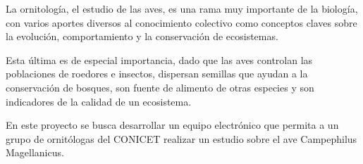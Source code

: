 
La ornitología, el estudio de las aves, es una rama muy importante de la biología, con varios aportes diversos al conocimiento colectivo como conceptos claves sobre la evolución, comportamiento y la conservación de ecosistemas.

Esta última es de especial importancia, dado que las aves controlan las poblaciones de roedores e insectos, dispersan semillas que ayudan a la conservación de bosques, son fuente de alimento de otras especies y son indicadores de la calidad de un ecosistema.


En este proyecto se busca desarrollar un equipo electrónico que permita a un grupo de ornitólogas del CONICET realizar un estudio sobre el ave Campephilus Magellanicus.%

